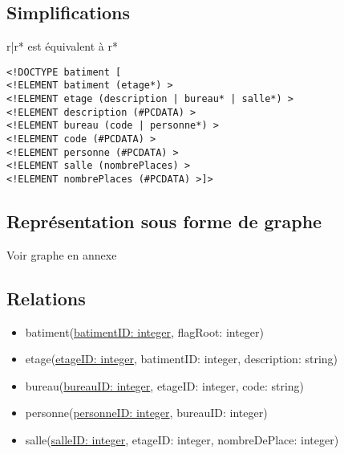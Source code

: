 \subsection{Simplifications}
r|r* est équivalent à r*
\begin{verbatim}
<!DOCTYPE batiment [ 
<!ELEMENT batiment (etage*) >
<!ELEMENT etage (description | bureau* | salle*) >
<!ELEMENT description (#PCDATA) >
<!ELEMENT bureau (code | personne*) >
<!ELEMENT code (#PCDATA) >
<!ELEMENT personne (#PCDATA) >
<!ELEMENT salle (nombrePlaces) >
<!ELEMENT nombrePlaces (#PCDATA) >]>
\end{verbatim}

\subsection{Représentation sous forme de graphe}
Voir graphe en annexe

\subsection{Relations}
\begin{itemize}
\item batiment(\underline{batimentID: integer}, flagRoot: integer)
\item etage(\underline{etageID: integer}, batimentID: integer, description: string)
\item bureau(\underline{bureauID: integer}, etageID: integer, code: string)
\item personne(\underline{personneID: integer}, bureauID: integer)
\item salle(\underline{salleID: integer}, etageID: integer, nombreDePlace: integer)
\end{itemize}
